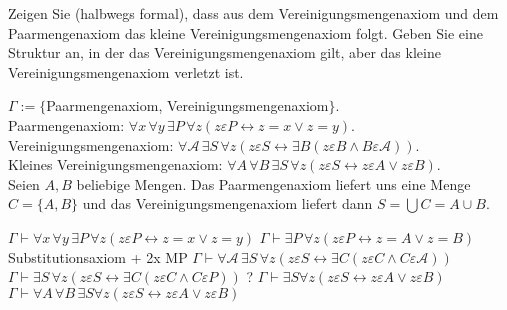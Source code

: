 
\begin{exercise}[258]

Zeigen Sie (halbwegs formal), dass aus dem Vereinigungsmengenaxiom und dem
Paarmengenaxiom das kleine Vereinigungsmengenaxiom folgt. Geben Sie eine Struktur
an, in der das Vereinigungsmengenaxiom gilt, aber das kleine Vereinigungsmengenaxiom
verletzt ist.

\end{exercise}


\begin{solution}
$\Gamma := \{$Paarmengenaxiom, Vereinigungsmengenaxiom$\}$. \\
Paarmengenaxiom: $\forall x\, \forall y\, \exists P \, \forall z
(z \varepsilon P \leftrightarrow z = x \lor z = y)$. \\
Vereinigungsmengenaxiom:
$\forall \mathcal{A}\, \exists S\, \forall z (z \varepsilon S \leftrightarrow
\exists B (z \varepsilon B \land B \varepsilon \mathcal{A}))$. \\
Kleines Vereinigungsmengenaxiom:
$\forall A\, \forall B\, \exists S\, \forall z (z \varepsilon S \leftrightarrow
z \varepsilon A \lor z \varepsilon B)$. \\

Seien $A, B$ beliebige Mengen.
Das Paarmengenaxiom liefert uns eine Menge $C = \{A, B\}$ und das
Vereinigungsmengenaxiom liefert dann $S = \bigcup C = A \cup B$.

\begin{algorithmic}[1]
\State $\Gamma \vdash \forall x\, \forall y\, \exists P \, \forall z
(z \varepsilon P \leftrightarrow z = x \lor z = y)$
\State $\Gamma \vdash \exists P \, \forall z
(z \varepsilon P \leftrightarrow z = A \lor z = B)$
\Comment Substitutionsaxiom + 2x MP
\State $\Gamma \vdash \forall \mathcal{A}\, \exists S\, \forall z (z \varepsilon S \leftrightarrow
\exists C (z \varepsilon C \land C \varepsilon \mathcal{A}))$
\State $\Gamma \vdash \exists S\, \forall z (z \varepsilon S \leftrightarrow
\exists C (z \varepsilon C \land C \varepsilon P))$
\State ?
\State $\Gamma \vdash \exists S \forall z (z \varepsilon S \leftrightarrow z \varepsilon A \lor z \varepsilon B)$
\State $\Gamma \vdash \forall A\, \forall B\, \exists S \forall z (z \varepsilon S \leftrightarrow z \varepsilon A \lor z \varepsilon B)$


\end{algorithmic}
\end{solution}
